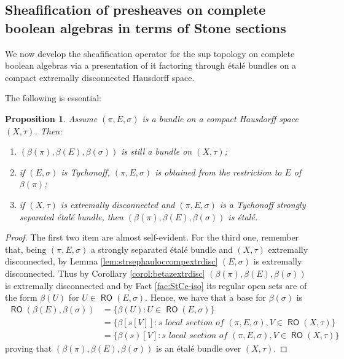\documentclass[11pt]{amsart}
\theoremstyle{plain}
\newtheorem{proposition}[theorem]{Proposition}
\theoremstyle{definition}
\theoremstyle{plain}
\theoremstyle{remark}
\DeclareMathOperator{\RO}{\mathsf{RO}}
\newcommand{\0}{\mathsf{0}}
\renewcommand{\1}{\mathsf{1}}
\renewcommand{\2}{\mathsf{2}}
\theoremstyle{definition}
\begin{document}
\subsection{Sheafification of presheaves on complete boolean algebras in terms of Stone sections}


We now develop  the sheafification operator for the sup topology on complete boolean algebras via a presentation of it factoring through \'etal\'e bundles on a compact extremally disconnected Hausdorff space.

The following is essential:

\begin{proposition}
\label{prop:betaEetalebundle}
Assume $(\pi,E,\sigma)$ is a bundle on a compact Hausdorff space $(X,\tau)$. Then:
\begin{enumerate}
\item $(\beta(\pi),\beta(E),\beta(\sigma))$ is still a bundle on $(X,\tau)$;
\item if $(E,\sigma)$ is Tychonoff, $(\pi,E,\sigma)$ is obtained from the restriction to $E$ of $\beta(\pi)$;
\item if $(X, \tau)$ is extremally disconnected and $(\pi, E, \sigma)$ is a Tychonoff strongly separated \'etal\'e bundle, then $(\beta(\pi), \beta(E), \beta(\sigma))$ is \'etal\'e.
\end{enumerate}
\end{proposition}
\begin{proof}
The first two item are almost self-evident. For the third one, remember that, being $(\pi, E, \sigma)$ a strongly separated \'etal\'e bundle and $(X, \tau)$ extremally disconnected, by Lemma \ref{lem:strsephauloccompextrdisc} $(E, \sigma)$ is extremally disconnected. Thus by Corollary \ref{corol:betazextrdisc} $(\beta(\pi), \beta(E), \beta(\sigma))$ is extremally disconnected and by Fact \ref{fac:StCe-iso} its regular open sets are of the form $\beta(U)$ for $U\in\RO(E, \sigma)$. Hence, we have that a base for $\beta(\sigma)$ is
\[
\begin{aligned}
\RO(\beta(E), \beta(\sigma))&=\{\beta(U): U\in\RO(E, \sigma)\}\\
&=\{\beta[s[V]]: s\textit{ local section of $(\pi, E, \sigma)$}, V\in\RO(X,\tau)\}\\
&=\{\beta(s)[V]: s\textit{ local section of $(\pi, E, \sigma)$}, V\in\RO(X,\tau)\}
\end{aligned}
\]
proving that $(\beta(\pi), \beta(E), \beta(\sigma))$ is an \'etal\'e bundle over $(X, \tau)$.
\end{proof}
\end{document}
